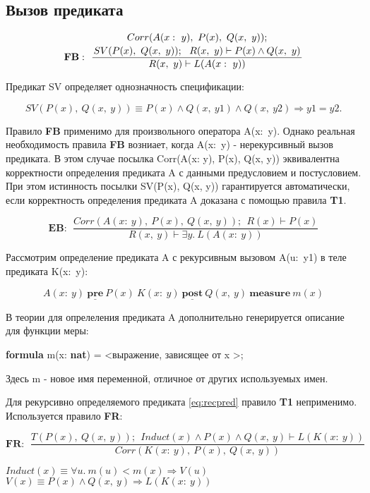 \documentclass[10pt,a4paper]{article}
\newcommand{\ruleI}[3] {
$$
\mathbf{#1:} ~~
\frac{#2}{#3}
$$
}
\newcommand{\ruleII}[4] {
\ruleI{#1}
{\genfrac{}{}{0pt}{0}{#2}{#3}}
{#4}
}
\newcommand{\numformula}[2] {
\begin{equation}
\label{eq:#1}
#2
\end{equation}
}
\newcommand{\lnkformula}[1] {
\eqref{eq:#1}
}
\begin{document}
\subsection{Вызов предиката}

\ruleII{FB}
{Corr(A(x:~y),~P(x),~Q(x,~y));}
{SV(P(x),~Q(x,~y));~~R(x,~y) \vdash P(x) \land Q(x,~y)}
{R(x,~y) \vdash L(A(x:~y))}

Предикат SV определяет однозначность спецификации:

\numformula{singlespec} {
SV(P(x),~Q(x,~y)) \equiv P(x) \land Q(x,~y1) \land Q(x,~y2) \Rightarrow y1 = y2 .
}

Правило \textbf{FB} применимо для произвольного оператора A(x: y). Однако реальная необходимость правила \textbf{FB} возниает, когда A(x: y) - нерекурсивный вызов предиката. В этом случае посылка Corr(A(x: y), P(x), Q(x, y)) эквивалентна корректности определения предиката A с данными предусловием и постусловием. При этом истинность посылки SV(P(x), Q(x, y)) гарантируется автоматически, если корректность определения предиката A доказана с помощью правила \textbf{T1}.

\ruleI{EB}
{Corr(A(x:~y),~P(x),~Q(x,~y));~~R(x) \vdash P(x)}
{R(x,~y) \vdash \exists y.~L(A(x:~y))}

Рассмотрим определение предиката A с рекурсивным вызовом A(u: y1) в теле предиката K(x: y):

\numformula{recpred} {
A(x:~y)~\underline{\mathbf{pre}}~P(x)~{ K(x:~y)}~\underline{\mathbf{post}}~Q(x,~y)~\textbf{measure}~m(x)
}

В теории для опрелеления предиката A дополнительно генерируется описание для функции меры:

\begin{center}
\textbf{formula} m(x: \textbf{nat}) = <выражение, зависящее от x >;
\end{center}

Здесь m - новое имя переменной, отличное от других используемых имен.

Для рекурсивно определяемого предиката \lnkformula{recpred} правило \textbf{T1} неприменимо. Используется правило \textbf{FR}:

\ruleI{FR}
{T(P(x),~Q(x,~y));~~Induct(x) \land P(x) \land Q(x,~y) \vdash L(K(x:~y))}
{Corr(K(x:~y),~P(x),~Q(x,~y))}

\begin{center}
$ Induct(x) \equiv \forall u.~m(u)<m(x) \Rightarrow V(u) $ \\
$ V(x) \equiv P(x) \land Q(x,~y) \Rightarrow L(K(x:~y)) $
\end{center}
\end{document}
